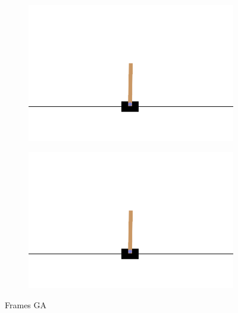 \begin{figure}[H]
	\hfill
	\begin{subfigure}
		\centering
		\includegraphics[width=0.3\linewidth]{Images/frames/GA/11.png}
	\end{subfigure}
	\hfill
	\begin{subfigure}
		\centering
		\includegraphics[width=0.3\linewidth]{Images/frames/GA/12.png}
	\end{subfigure}
	\caption{Frames GA}
	\label{fig:framesGA}
\end{figure}


	







